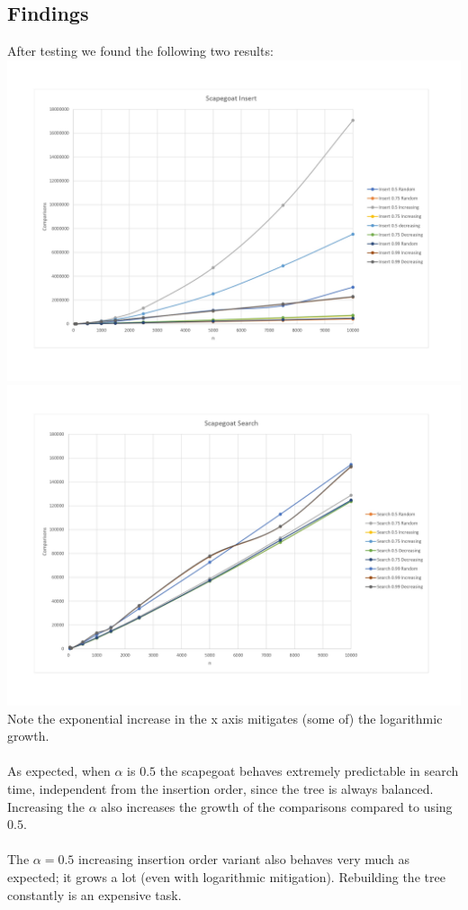 \documentclass[oneside]{scrbook}
\begin{document}
\subsection*{Findings}
After testing we found the following two results:\\
\includegraphics[scale=0.45]{sg-i.jpg}\\
\includegraphics[scale=0.45]{sg-s.jpg}\\
Note the exponential increase in the x axis mitigates (some of) the logarithmic growth.
\\\\
As expected, when $\alpha$ is $0.5$ the scapegoat behaves extremely predictable in search time, independent from the insertion order, since the tree is always balanced.
Increasing the $\alpha$ also increases the growth of the comparisons compared to using $0.5$.\\\\
The $\alpha = 0.5$ increasing insertion order variant also behaves very much as expected;
it grows a lot (even with logarithmic mitigation).
Rebuilding the tree constantly is an expensive task.
\end{document}
